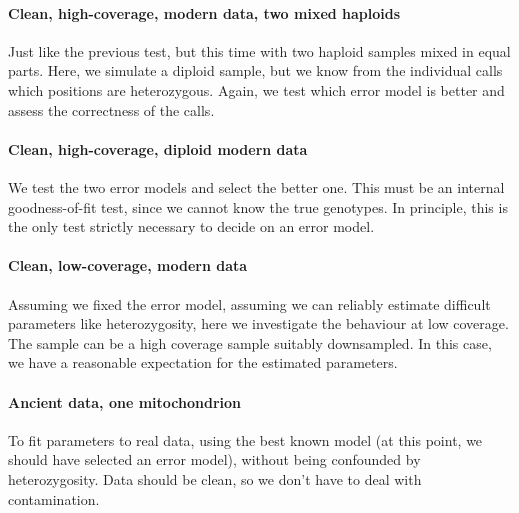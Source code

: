 \documentclass{article}
\begin{document}
\paragraph{Clean, high-coverage, modern data, two mixed haploids}

Just like the previous test, but this time with two haploid samples
mixed in equal parts.  Here, we simulate a diploid sample, but we know
from the individual calls which positions are heterozygous.  Again, we
test which error model is better and assess the correctness of the
calls.


\paragraph{Clean, high-coverage, diploid modern data}

We test the two error models and select the better one.  This must be an
internal goodness-of-fit test, since we cannot know the true genotypes.
In principle, this is the only test strictly necessary to decide on an
error model.


\paragraph{Clean, low-coverage, modern data}

Assuming we fixed the error model, assuming we can reliably estimate
difficult parameters like heterozygosity, here we investigate the
behaviour at low coverage.  The sample can be a high coverage sample
suitably downsampled.  In this case, we have a reasonable expectation
for the estimated parameters.

\paragraph{Ancient data, one mitochondrion}

To fit parameters to real data, using the best known model (at this
point, we should have selected an error model), without being confounded
by heterozygosity.  Data should be clean, so we don't have to deal with
contamination.
\end{document}
